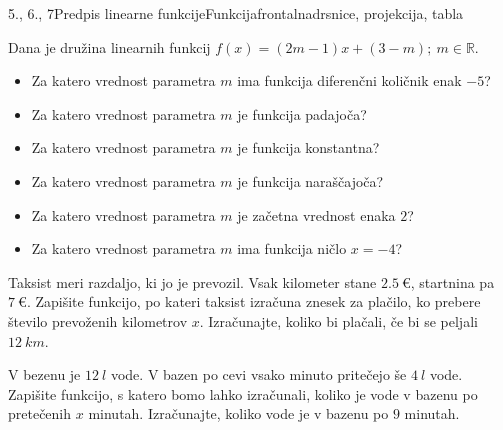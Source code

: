 \begin{priprava}{5., 6., 7}{}{Predpis linearne funkcije}{Funkcija}{frontalna}{drsnice, projekcija, tabla}
        
            \begin{naloga}
                Dana je družina linearnih funkcij $f(x)=(2m-1)x+(3-m); ~m\in\mathbb{R}$.
                    \begin{itemize}
                        \item Za katero vrednost parametra $m$ ima funkcija diferenčni količnik enak $-5$? 
                        \item Za katero vrednost parametra $m$ je funkcija padajoča?
                        \item Za katero vrednost parametra $m$ je funkcija konstantna? 
                        \item Za katero vrednost parametra $m$ je funkcija naraščajoča? 
                        \item Za katero vrednost parametra $m$ je začetna vrednost enaka $2$? 
                        \item Za katero vrednost parametra $m$ ima funkcija ničlo $x=-4$? 
                    \end{itemize}
            \end{naloga}
        


        
            \begin{naloga}
                Taksist meri razdaljo, ki jo je prevozil. Vsak kilometer stane $2.5~€$, startnina pa $7~€$.
                Zapišite funkcijo, po kateri taksist izračuna znesek za plačilo, ko prebere število prevoženih kilometrov $x$. 
                Izračunajte, koliko bi plačali, če bi se peljali $12~km$. 
            \end{naloga}

            \begin{naloga}
                V bezenu je $12~l$ vode. V bazen po cevi vsako minuto pritečejo še $4~l$ vode.
                Zapišite funkcijo, s katero bomo lahko izračunali, koliko je vode v bazenu po pretečenih $x$ minutah.
                Izračunajte, koliko vode je v bazenu po $9$ minutah. 
            \end{naloga}


        



\end{priprava}